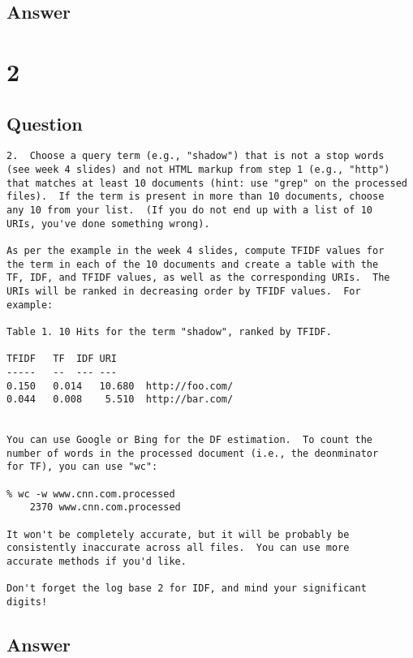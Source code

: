 \documentclass[letterpaper,11pt]{article}
\begin{document}
\newpage
\subsection*{Answer}

\newpage
\section*{2}

\subsection*{Question}

\begin{verbatim}
2.  Choose a query term (e.g., "shadow") that is not a stop words
(see week 4 slides) and not HTML markup from step 1 (e.g., "http")
that matches at least 10 documents (hint: use "grep" on the processed
files).  If the term is present in more than 10 documents, choose
any 10 from your list.  (If you do not end up with a list of 10
URIs, you've done something wrong).

As per the example in the week 4 slides, compute TFIDF values for
the term in each of the 10 documents and create a table with the
TF, IDF, and TFIDF values, as well as the corresponding URIs.  The
URIs will be ranked in decreasing order by TFIDF values.  For
example:

Table 1. 10 Hits for the term "shadow", ranked by TFIDF.

TFIDF	TF	IDF	URI
-----	--	---	---
0.150	0.014	10.680	http://foo.com/
0.044	0.008	 5.510	http://bar.com/


You can use Google or Bing for the DF estimation.  To count the
number of words in the processed document (i.e., the deonminator
for TF), you can use "wc":

% wc -w www.cnn.com.processed
    2370 www.cnn.com.processed

It won't be completely accurate, but it will be probably be
consistently inaccurate across all files.  You can use more 
accurate methods if you'd like.  

Don't forget the log base 2 for IDF, and mind your significant
digits!
\end{verbatim}

\newpage
\subsection*{Answer}

\newpage
\end{document}
